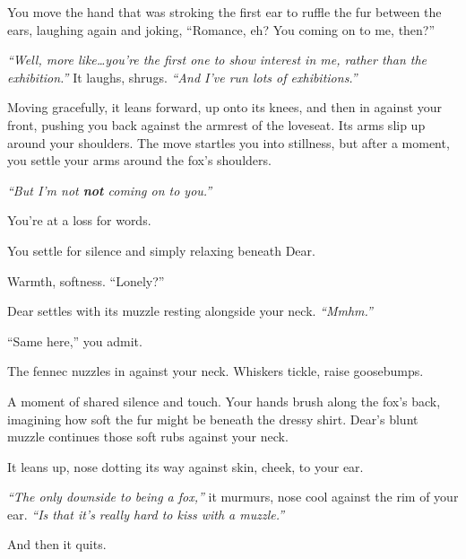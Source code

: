 You move the hand that was stroking the first ear to ruffle the fur between the ears, laughing again and joking, ``Romance, eh? You coming on to me, then?''

\emph{``Well, more like\ldots{}you're the first one to show interest in me, rather than the exhibition.''} It laughs, shrugs. \emph{``And I've run lots of exhibitions.''}

Moving gracefully, it leans forward, up onto its knees, and then in against your front, pushing you back against the armrest of the loveseat. Its arms slip up around your shoulders. The move startles you into stillness, but after a moment, you settle your arms around the fox's shoulders.

\emph{``But I'm not \textbf{not} coming on to you.''}

You're at a loss for words.

\phantom{You're at a loss for words. }{\scriptsize ``I'm flattered, but--''}

\phantom{You're at a loss for words. }{\tiny ``You're sweet, you know--''}

You settle for silence and simply relaxing beneath Dear.

Warmth, softness. ``Lonely?''

Dear settles with its muzzle resting alongside your neck. \emph{``Mmhm.''}

``Same here,'' you admit.

The fennec nuzzles in against your neck. Whiskers tickle, raise goosebumps.

A moment of shared silence and touch. Your hands brush along the fox's back, imagining how soft the fur might be beneath the dressy shirt. Dear's blunt muzzle continues those soft rubs against your neck.

It leans up, nose dotting its way against skin, cheek, to your ear.

\emph{``The only downside to being a fox,''} it murmurs, nose cool against the rim of your ear. \emph{``Is that it's really hard to kiss with a muzzle.''}

\vfill

\begin{flushright}
\footnotesize
And then it quits.\hspace{2cm}\null
\end{flushright}
\vspace{1cm}

\newpage

\null
\vfill

